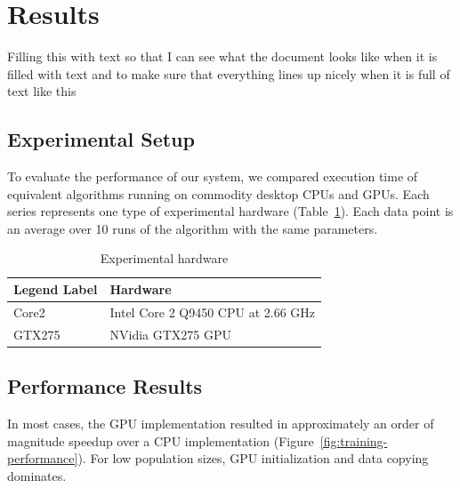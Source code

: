 \documentclass[11pt]{article}       %
\begin{document}
\section{Results} \label{results}
Filling this with text so that I can see what the document looks like when it is filled with text and to make sure that everything lines up nicely when it is full of text like this

\subsection{Experimental Setup} \label{experiment}
To evaluate the performance of our system, we compared execution time of equivalent algorithms running on commodity desktop CPUs and GPUs. Each series represents one type of experimental hardware (Table~\ref{tab:experimental-hardware}). Each data point is an average over 10 runs of the algorithm with the same parameters.

\begin{table}
	\centering
	\begin{tabular}{ll}
	\textbf{Legend Label} & \textbf{Hardware} \\
	\hline
	Core2 & Intel Core 2 Q9450 CPU at 2.66 GHz \\
	GTX275 & NVidia GTX275 GPU \\
	\hline
	\end{tabular}
	\caption{Experimental hardware}
	\label{tab:experimental-hardware}
\end{table}

\subsection{Performance Results} \label{performance}
In most cases, the GPU implementation resulted in approximately an order of magnitude speedup over a CPU implementation (Figure~\ref{fig:training-performance}). For low population sizes, GPU initialization and data copying dominates.
\end{document}
